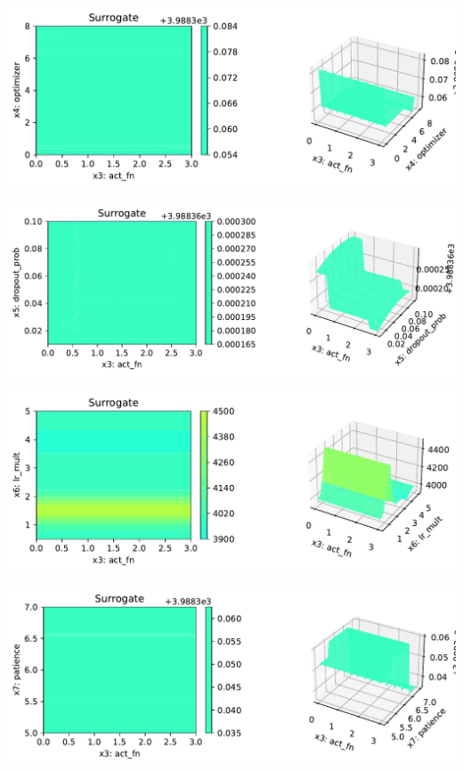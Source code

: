 \documentclass[
  letterpaper,
  DIV=11,
  numbers=noendperiod]{scrreprt}
\begin{document}
\includegraphics{031_spot_lightning_linear_diabetes_files/figure-pdf/cell-19-output-15.pdf}

\includegraphics{031_spot_lightning_linear_diabetes_files/figure-pdf/cell-19-output-16.pdf}

\includegraphics{031_spot_lightning_linear_diabetes_files/figure-pdf/cell-19-output-17.pdf}

\includegraphics{031_spot_lightning_linear_diabetes_files/figure-pdf/cell-19-output-18.pdf}
\end{document}

